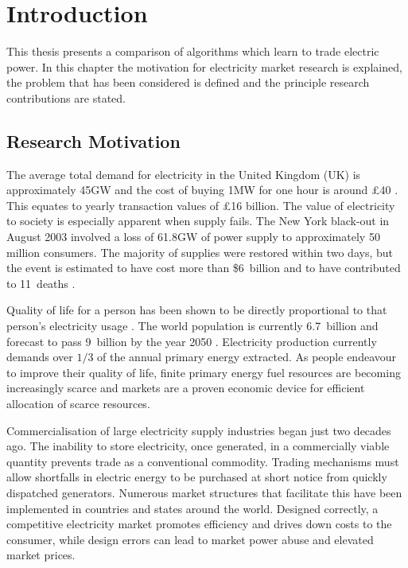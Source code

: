 \chapter{Introduction}
This thesis presents a comparison of algorithms which learn to trade electric
power.  In this chapter the motivation for electricity market
research is explained, the problem that has been considered is defined
and the principle research contributions are stated.

\section{Research Motivation}
The average total demand for electricity in the United Kingdom (UK) is
approximately 45GW and the cost of buying 1MW for one hour is around
\pounds40 \cite{decc:dukes09}. This equates to yearly transaction values of
\pounds16 billion.  The value of electricity to society is especially
apparent when supply fails. The New York black-out in August 2003 involved
a loss of 61.8GW of power supply to approximately 50 million consumers.
The majority of supplies were restored within two days, but the event is estimated to have cost more than \$6~billion and to have contributed to 11~deaths \cite{minkel:2008,icf:2003}.

Quality of life for a person has been shown to be directly proportional to that
person's electricity usage \cite{alam:qol}.  The world
population is currently 6.7~billion and forecast to pass 9~billion by the year 2050 \cite{un:pop}.
Electricity production currently demands over $1/3$ of the annual primary
energy extracted. As people endeavour to improve their quality of life,
finite primary energy fuel resources are becoming increasingly scarce and
markets are a proven economic device for efficient allocation of scarce
resources.

Commercialisation of large electricity supply industries began just two
decades ago. The inability to store electricity, once generated, in a
commercially viable quantity prevents trade as a conventional commodity.
Trading mechanisms must allow shortfalls in electric energy to be purchased at
short notice from quickly dispatched generators.  Numerous market structures
that facilitate this have been implemented in countries and states around the
world.  Designed correctly, a competitive electricity market promotes
efficiency and drives down costs to the consumer, while design errors can
lead to market power abuse and elevated market prices.

